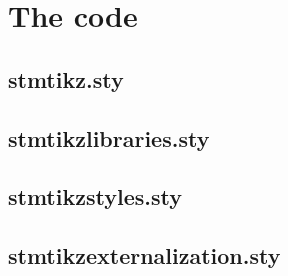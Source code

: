 \documentclass{scrartcl}
\begin{document}
\newpage
\appendix

\section{The code}

\subsection{stmtikz.sty}



\newpage
\subsection{stmtikzlibraries.sty}



\newpage
\subsection{stmtikzstyles.sty}



\newpage
\subsection{stmtikzexternalization.sty}


\end{document}
